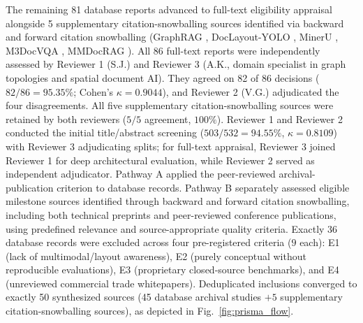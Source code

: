 \documentclass[conference,a4paper]{IEEEtran}
\begin{document}
The remaining 81 database reports advanced to full-text eligibility appraisal alongside 5 supplementary citation-snowballing sources identified via backward and forward citation snowballing (GraphRAG \cite{edge2024}, DocLayout-YOLO \cite{zhao2024doclayout}, MinerU \cite{wang2024mineru}, M3DocVQA \cite{m3docvqa2025}, MMDocRAG \cite{dong2025mmdocrag}). All 86 full-text reports were independently assessed by Reviewer 1 (S.J.) and Reviewer 3 (A.K., domain specialist in graph topologies and spatial document AI). They agreed on 82 of 86 decisions ($82/86 = 95.35\%$; Cohen's $\kappa = 0.9044$), and Reviewer 2 (V.G.) adjudicated the four disagreements. All five supplementary citation-snowballing sources were retained by both reviewers ($5/5$ agreement, $100\%$). Reviewer 1 and Reviewer 2 conducted the initial title/abstract screening ($503/532 = 94.55\%$, $\kappa = 0.8109$) with Reviewer 3 adjudicating splits; for full-text appraisal, Reviewer 3 joined Reviewer 1 for deep architectural evaluation, while Reviewer 2 served as independent adjudicator. Pathway A applied the peer-reviewed archival-publication criterion to database records. Pathway B separately assessed eligible milestone sources identified through backward and forward citation snowballing, including both technical preprints and peer-reviewed conference publications, using predefined relevance and source-appropriate quality criteria. Exactly 36 database records were excluded across four pre-registered criteria ($9$ each): E1 (lack of multimodal/layout awareness), E2 (purely conceptual without reproducible evaluations), E3 (proprietary closed-source benchmarks), and E4 (unreviewed commercial trade whitepapers). Deduplicated inclusions converged to exactly 50 synthesized sources (45 database archival studies $+ 5$ supplementary citation-snowballing sources), as depicted in Fig.~\ref{fig:prisma_flow}.
\end{document}
